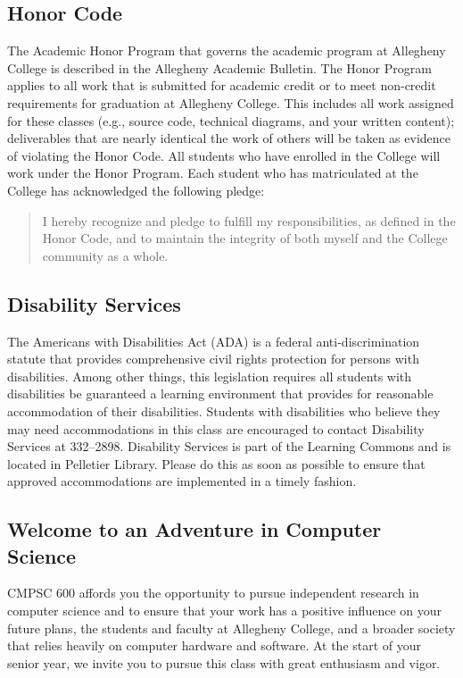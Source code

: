 \documentclass[11pt]{article}
\begin{document}
\subsection*{Honor Code}

The Academic Honor Program that governs the academic program at Allegheny College is described in the Allegheny
Academic Bulletin.  The Honor Program applies to all work that is submitted for academic credit or to meet non-credit
requirements for graduation at Allegheny College.  This includes all work assigned for these classes (e.g., source code,
technical diagrams, and your written content); deliverables that are nearly identical the work of others will be taken
as evidence of violating the Honor Code. All students who have enrolled in the College will work under the Honor
Program.  Each student who has matriculated at the College has acknowledged the following pledge:

\begin{quote}
I hereby recognize and pledge to fulfill my responsibilities, as defined in the Honor Code, and to maintain the
integrity of both myself and the College community as a whole.
\end{quote}

\subsection*{Disability Services}

The Americans with Disabilities Act (ADA) is a federal anti-discrimination statute that provides comprehensive civil
rights protection for persons with disabilities.  Among other things, this legislation requires all students with
disabilities be guaranteed a learning environment that provides for reasonable accommodation of their disabilities.
Students with disabilities who believe they may need accommodations in this class are encouraged to contact Disability
Services at 332--2898.  Disability Services is part of the Learning Commons and is located in Pelletier Library.
Please do this as soon as possible to ensure that approved accommodations are implemented in a timely fashion.

\subsection*{Welcome to an Adventure in Computer Science}

CMPSC 600 affords you the opportunity to pursue independent research in computer science and to ensure that your work
has a positive influence on your future plans, the students and faculty at Allegheny College, and a broader society that
relies heavily on computer hardware and software.  At the start of your senior year, we invite you to pursue this class
with great enthusiasm and vigor.
\end{document}

